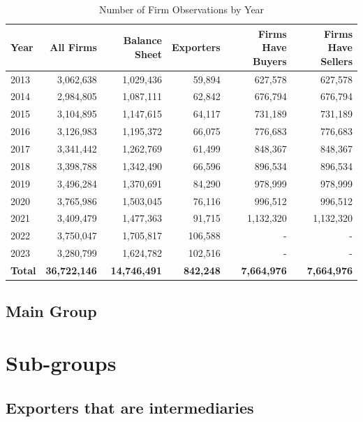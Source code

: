 \documentclass{article}
\begin{document}
\begin{table}[h]
    \centering
    \caption{Number of Firm Observations by Year}
    \begin{tabular}{lrrrrr}
        \toprule
        Year & All Firms & Balance Sheet & Exporters & Firms Have Buyers & Firms Have Sellers \\
        \midrule
        2013 & 3,062,638 & 1,029,436 & 59,894 & 627,578 & 627,578 \\
        2014 & 2,984,805 & 1,087,111 & 62,842 & 676,794 & 676,794 \\
        2015 & 3,104,895 & 1,147,615 & 64,117 & 731,189 & 731,189 \\
        2016 & 3,126,983 & 1,195,372 & 66,075 & 776,683 & 776,683 \\
        2017 & 3,341,442 & 1,262,769 & 61,499 & 848,367 & 848,367 \\
        2018 & 3,398,788 & 1,342,490 & 66,596 & 896,534 & 896,534 \\
        2019 & 3,496,284 & 1,370,691 & 84,290 & 978,999 & 978,999 \\
        2020 & 3,765,986 & 1,503,045 & 76,116 & 996,512 & 996,512 \\
        2021 & 3,409,479 & 1,477,363 & 91,715 & 1,132,320 & 1,132,320 \\
        2022 & 3,750,047 & 1,705,817 & 106,588 & - & - \\
        2023 & 3,280,799 & 1,624,782 & 102,516 & - & - \\
        \midrule
        \textbf{Total} & \textbf{36,722,146} & \textbf{14,746,491} & \textbf{842,248} & \textbf{7,664,976} & \textbf{7,664,976} \\
        \bottomrule
    \end{tabular}
    
    \label{tab:firm_stats}
\end{table}

\subsection{Main Group}


\section*{Sub-groups}
\subsection{Exporters that are intermediaries}

\end{document}
